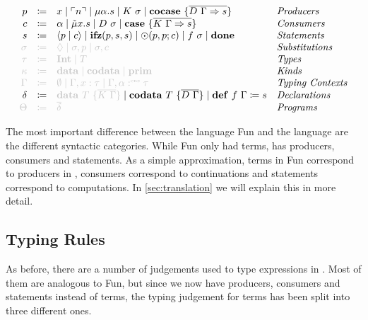 \begin{definition}
  \[
    \begin{array}{rcll}
      p & \coloneqq & x \mid \lit{n} \mid \mu\alpha.s \mid K\ \sigma \mid \cocase{\overline{D\ \Gamma \Rightarrow s}} & \emph{Producers}\\
      c & \coloneqq & \alpha \mid \tilde{\mu}x.s \mid D\ \sigma \mid \case{\overline{K\ \Gamma \Rightarrow s}}& \emph{Consumers}\\
      s & \coloneqq & \cut{p}{c} \mid \ifz{p}{s}{s} \mid \odot(p, p; c) \mid f\ \sigma\mid \done & \emph{Statements}\\
      \grey{\sigma} & \grey{\coloneqq} & \grey{\nil \mid \sigma, p \mid \sigma, c} & \emph{Substitutions}\\
      \grey{\tau} & \grey{\coloneqq} & \grey{\tyint \mid T} & \emph{Types}\\
      \grey{\kappa} & \grey{\coloneqq} & \grey{\mathbf{data}\mid\mathbf{codata}\mid\mathbf{prim}} & \emph{Kinds}\\
      \grey{\Gamma} & \grey{\coloneqq} & \grey{\emptyset \mid \Gamma, x : \tau \mid \Gamma, \alpha \cnt \tau} & \emph{Typing Contexts} \\
      \delta & \coloneqq & \grey{\mathbf{data}\ T\ \{ \overline{K\ \Gamma} \}} \mid \mathbf{codata}\ T\ \{ \overline{D\ \Gamma }\} \mid \defi{f\ \Gamma}{s} & \emph{Declarations}\\
      \grey{\Theta} & \grey{\coloneqq} & \grey{\overline{\delta}} & \emph{Programs}\\
    \end{array}
  \]
\end{definition}
The most important difference between the language Fun and the language \targetlang{} are the different syntactic categories.
While Fun only had terms, \targetlang{} has producers, consumers and statements. 
As a simple approximation, terms in Fun correspond to producers in \targetlang{}, consumers correspond to continuations and statements correspond to computations. 
In \cref{sec:translation} we will explain this in more detail.

\subsection{Typing Rules}
\label{subsec:core:typing-rules}

As before, there are a number of judgements used to type expressions in \targetlang{}. 
Most of them are analogous to Fun, but since we now have producers, consumers and statements instead of terms, the typing judgement for terms has been split into three different ones. 

